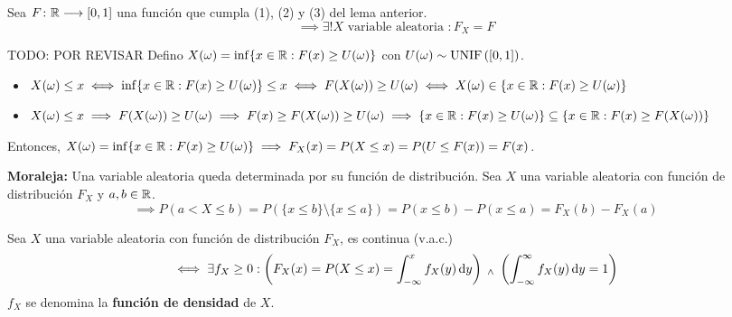 \begin{teo}
	Sea $F \colon \mathbb{R} \longrightarrow [0, 1]$ una función que cumpla (1), (2) y (3) del lema anterior.
	\[\implies \exists! X \text{ variable aleatoria } : F_X = F\]
	\begin{dem} TODO: POR REVISAR
		Defino $X(\omega) = \inf\{x\in\mathbb{R} : F(x) \geq U(\omega)\}$ con $U(\omega) \sim \operatorname{UNIF}\left([0,1]\right)$.
		\begin{itemize}
			\item $X(\omega) \leq x \iff \inf\{x\in\mathbb{R} : F(x) \geq U(\omega)\} \leq x \iff F(X(\omega)) \geq U(\omega) \iff X(\omega) \in \{x\in\mathbb{R} : F(x) \geq U(\omega)\}$
			\item $X(\omega) \leq x \implies F(X(\omega)) \geq U(\omega) \implies F(x) \geq F(X(\omega)) \geq U(\omega) \implies \{x\in\mathbb{R} : F(x) \geq U(\omega)\} \subseteq \{x\in\mathbb{R} : F(x) \geq F(X(\omega))\}$
		\end{itemize}
		Entonces, $X(\omega) = \inf\{x\in\mathbb{R} : F(x) \geq U(\omega)\} \implies F_X(x) = P(X\leq x) = P(U\leq F(x)) = F(x)$.
	\end{dem}
\end{teo}
\textbf{Moraleja:} Una variable aleatoria queda determinada por su función de distribución.
Sea $X$ una variable aleatoria con función de distribución $F_X$ y $a,b\in \mathbb{R}$.
\[\implies P(a<X\leq b)=P(\{x\leq b\}\setminus \{x\leq a\}) = P(x\leq b) - P(x\leq a) = F_X(b)-F_X(a)\]
\begin{defn}
	Sea $X$ una variable aleatoria con función de distribución $F_X$, es continua (v.a.c.)
	\[\iff \exists f_X \geq 0 : \left(F_X(x) = P(X\leq x)=\int_{-\infty}^{x} f_X(y) \odif{y}\right) \we \left(\int_{-\infty}^{\infty} f_X(y) \odif{y}=1\right)\]
	$f_X$ se denomina la \textbf{función de densidad} de $X$.
\end{defn}

